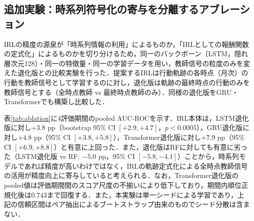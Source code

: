 \documentclass[submit,noauthor,ses,dvipdfmx]{ipsj}
\newcommand{\todo}[1]{\colorbox{yellow}{{\bf TODO}:}{\color{red} {\textbf{[#1]}}}}
\newcommand{\fixstart}{\color{magenta}}
\begin{document}






\fixstart
\subsection{追加実験：時系列符号化の寄与を分離するアブレーション}\label{sec:ablation}
IRLの精度の源泉が「時系列情報の利用」によるものか，「IRLとしての報酬関数の定式化」によるものかを切り分けるため，同一のバックボーン（LSTM，隠れ層次元128）・同一の特徴量・同一の学習データを用い，教師信号の粒度のみを変えた退化版との比較実験を行った．提案するIRLは行動軌跡の各時点（月次）の行動を教師信号として学習するのに対し，退化版は軌跡の最終時点の行動のみを教師信号とする（全時点教師 vs 最終時点教師のみ）．同様の退化版をGRU・Transformerでも構築し比較した．

表\ref{tab:ablation}に4評価期間のpooled AUC-ROCを示す．IRL本体は，LSTM退化版に対し$+3.8$ pp（bootstrap 95\% CI $[+2.9, +4.7]$，$p<0.0005$），GRU退化版に対し$+4.8$ pp（95\% CI $[+3.8, +5.8]$），Transformer退化版に対し$+7.9$ pp（95\% CI $[+6.9, +8.8]$）と有意に上回った．また，退化版はRFに対しても有意に劣った（LSTM退化版 vs RF: $-5.0$ pp，95\% CI $[-5.8, -4.1]$）ことから，時系列モデルであれば精度が高いわけではなく，IRLの軌跡定式化による全時点教師信号の活用が精度向上に寄与していると考えられる．なお，Transformer退化版のpooled値は評価期間間のスコア尺度の不揃いにより低下しており，期間内順位正規化後は$0.743$まで回復する．また，本実験は単一シードによる学習であり，上記の信頼区間はペア抽出によるブートストラップ由来のものでシード分散は含まない．
\end{document}

